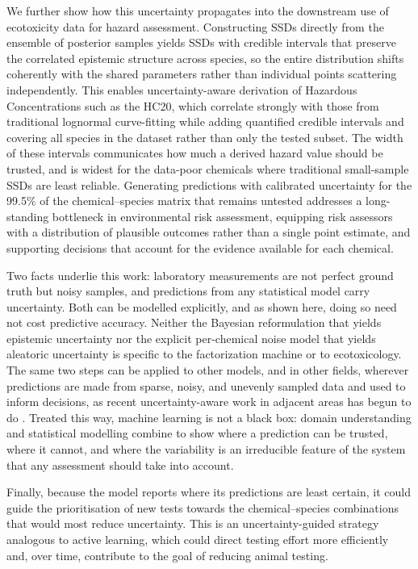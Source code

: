 We further show how this uncertainty propagates into the downstream use of ecotoxicity data for hazard assessment. Constructing SSDs directly from the ensemble of posterior samples yields SSDs with credible intervals that preserve the correlated epistemic structure across species, so the entire distribution shifts coherently with the shared parameters rather than individual points scattering independently. This enables uncertainty-aware derivation of Hazardous Concentrations such as the HC20, which correlate strongly with those from traditional lognormal curve-fitting while adding quantified credible intervals and covering all species in the dataset rather than only the tested subset. The width of these intervals communicates how much a derived hazard value should be trusted, and is widest for the data-poor chemicals where traditional small-sample SSDs are least reliable. Generating predictions with calibrated uncertainty for the 99.5\% of the chemical--species matrix that remains untested addresses a long-standing bottleneck in environmental risk assessment, equipping risk assessors with a distribution of plausible outcomes rather than a single point estimate, and supporting decisions that account for the evidence available for each chemical.

Two facts underlie this work: laboratory measurements are not perfect ground truth but noisy samples, and predictions from any statistical model carry uncertainty. Both can be modelled explicitly, and as shown here, doing so need not cost predictive accuracy. Neither the Bayesian reformulation that yields epistemic uncertainty nor the explicit per-chemical noise model that yields aleatoric uncertainty is specific to the factorization machine or to ecotoxicology. The same two steps can be applied to other models, and in other fields, wherever predictions are made from sparse, noisy, and unevenly sampled data and used to inform decisions, as recent uncertainty-aware work in adjacent areas has begun to do \citep{von2026uncertainty, iwasaki2026bayesian}. Treated this way, machine learning is not a black box: domain understanding and statistical modelling combine to show where a prediction can be trusted, where it cannot, and where the variability is an irreducible feature of the system that any assessment should take into account.

Finally, because the model reports where its predictions are least certain, it could guide the prioritisation of new tests towards the chemical--species combinations that would most reduce uncertainty. This is an uncertainty-guided strategy analogous to active learning, which could direct testing effort more efficiently and, over time, contribute to the goal of reducing animal testing.

